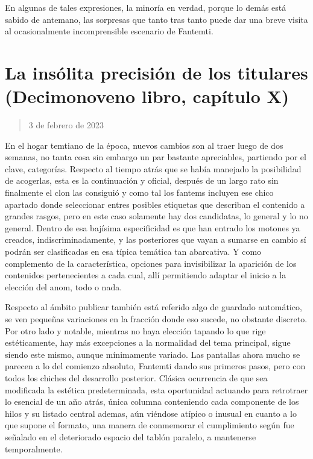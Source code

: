 \documentclass[
]{book}
\begin{document}
En algunas de tales expresiones, la minoría en verdad, porque lo demás está sabido de antemano, las sorpresas que tanto tras tanto puede dar una breve visita al ocasionalmente incomprensible escenario de Fantemti.

\hypertarget{la-insuxf3lita-precisiuxf3n-de-los-titulares-decimonoveno-libro-capuxedtulo-x}{%
\section{La insólita precisión de los titulares (Decimonoveno libro, capítulo X)}\label{la-insuxf3lita-precisiuxf3n-de-los-titulares-decimonoveno-libro-capuxedtulo-x}}

\begin{quote}
3 de febrero de 2023
\end{quote}

En el hogar temtiano de la época, nuevos cambios son al traer luego de dos semanas, no tanta cosa sin embargo un par bastante apreciables, partiendo por el clave, categorías. Respecto al tiempo atrás que se había manejado la posibilidad de acogerlas, esta es la continuación y oficial, después de un largo rato sin finalmente el clon las consiguió y como tal los fantems incluyen ese chico apartado donde seleccionar entres posibles etiquetas que describan el contenido a grandes rasgos, pero en este caso solamente hay dos candidatas, lo general y lo no general. Dentro de esa bajísima especificidad es que han entrado los motones ya creados, indiscriminadamente, y las posteriores que vayan a sumarse en cambio sí podrán ser clasificadas en esa típica temática tan abarcativa. Y como complemento de la característica, opciones para invisibilizar la aparición de los contenidos pertenecientes a cada cual, allí permitiendo adaptar el inicio a la elección del anom, todo o nada.

Respecto al ámbito publicar también está referido algo de guardado automático, se ven pequeñas variaciones en la fracción donde eso sucede, no obstante discreto. Por otro lado y notable, mientras no haya elección tapando lo que rige estéticamente, hay más excepciones a la normalidad del tema principal, sigue siendo este mismo, aunque mínimamente variado. Las pantallas ahora mucho se parecen a lo del comienzo absoluto, Fantemti dando sus primeros pasos, pero con todos los chiches del desarrollo posterior. Clásica ocurrencia de que sea modificada la estética predeterminada, esta oportunidad actuando para retrotraer lo esencial de un año atrás, única columna conteniendo cada componente de los hilos y su listado central ademas, aún viéndose atípico o inusual en cuanto a lo que supone el formato, una manera de conmemorar el cumplimiento según fue señalado en el deteriorado espacio del tablón paralelo, a mantenerse temporalmente.
\end{document}
